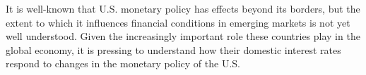 It is well-known that U.S. monetary policy has effects beyond its borders, but the extent to which it influences financial conditions in emerging markets is not yet well understood.
Given the increasingly important role these countries play in the global economy, it is pressing to understand how their domestic interest rates respond to changes in the monetary policy of the U.S.




